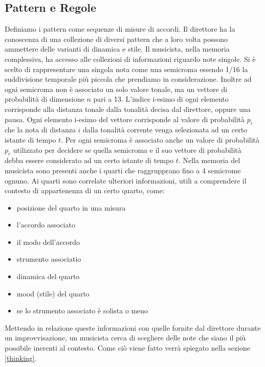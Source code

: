 \subsection{Pattern e Regole}
Definiamo i pattern come sequenze di misure di accordi. 
Il direttore ha la conoscenza di una collezione di diversi pattern che
a loro volta possono ammettere delle varianti di dinamica e stile.
Il musicista, nella memoria complessiva, ha accesso alle collezioni di
informazioni riguardo note singole. 
Si è scelto di rappresentare una singola nota come una semicroma essendo 
1/16 la suddivisione temporale più piccola che prendiamo in considerazione.
Inoltre ad ogni semicroma non è associato un solo valore tonale, ma un
vettore di probabilità di dimensione $n$ pari a 13. L'indice i-esimo
di ogni elemento corrisponde alla distanza tonale dalla tonalità decisa
dal direttore, oppure una pausa. Ogni elemento i-esimo del vettore 
corrisponde al valore di probabilità $p_i$ che la nota di distanza 
$i$ dalla tonalità corrente venga selezionata ad un certo istante di tempo $t$. 
Per ogni semicroma è associato anche un valore di probabilità $p_c$
utilizzato per decidere se quella semicroma e il suo vettore di
probabilità debba essere considerato ad un certo istante di tempo $t$.
Nella memoria del musicista sono presenti anche i quarti che raggrupprano 
fino a 4 semicrome ognuno. Ai quarti sono correlate ulteriori informazioni, utili
a comprendere il contesto di appartenenza di un certo quarto, come:
\begin{itemize}
\item posizione del quarto in una misura
\item l'accordo associato
\item il modo dell'accordo 
\item strumento associatio
\item dinamica del quarto
\item mood (stile) del quarto
\item se lo strumento associato è solista o meno
\end{itemize}
Mettendo in relazione queste informazioni con quelle fornite dal
direttore durante un improvvisazione, un musicista cerca di 
scegliere delle note che siano il più possibile inerenti al contesto.
Come ciò viene fatto verrà spiegato nella sezione \ref{thinking}.
